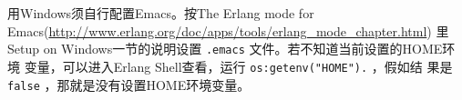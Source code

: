 \documentclass[preview,multi,crop=false,border=1in,class=memoir]{standalone}
\begin{document}
\begin{preview-page}
\nonzeroparskip

用Windows须自行配置Emacs。按The Erlang mode for
Emacs(\url{http://www.erlang.org/doc/apps/tools/erlang_mode_chapter.html})
里Setup on Windows一节的说明设置 \verb|.emacs| 文件。若不知道当前设置的HOME环境
变量，可以进入Erlang Shell查看，运行 \verb|os:getenv("HOME").| ，假如结
果是 \verb|false| ，那就是没有设置HOME环境变量。

\end{preview-page}
\end{document}
